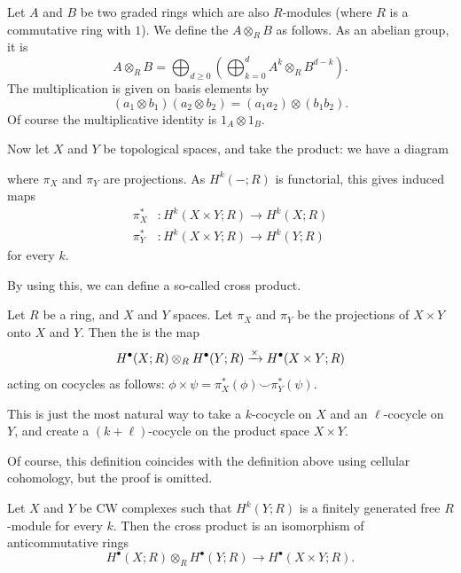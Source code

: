 \begin{definition}
	Let $A$ and $B$ be two graded rings which are also $R$-modules
	(where $R$ is a commutative ring with $1$).
	We define the  $A \otimes_R B$ as follows.
	As an abelian group, it is
	\[ A \otimes_R B = \bigoplus_{d \ge 0}
		\left( \bigoplus_{k=0}^{d} A^k \otimes_R B^{d-k}  \right). \]
	The multiplication is given on basis elements by
	\[ \left( a_1 \otimes b_1 \right)\left( a_2 \otimes b_2 \right)
		= (a_1a_2) \otimes (b_1b_2).
	\]
	Of course the multiplicative identity is $1_A \otimes 1_B$.
\end{definition}

Now let $X$ and $Y$ be topological spaces, and take the product:
we have a diagram
\begin{center}
\end{center}
where $\pi_X$ and $\pi_Y$ are projections.
As $H^k(-; R)$ is functorial, this gives induced maps
\begin{align*}
	\pi_X^\ast &: H^k(X \times Y; R) \to H^k(X; R) \\
	\pi_Y^\ast &: H^k(X \times Y; R) \to H^k(Y; R)
\end{align*}
for every $k$.

By using this, we can define a so-called cross product.
\begin{definition}
	Let $R$ be a ring, and $X$ and $Y$ spaces.
	Let $\pi_X$ and $\pi_Y$ be the projections of $X \times Y$
	onto $X$ and $Y$.
	Then the  is the map
	\[
		H^\bullet(X; R) \otimes_R H^\bullet(Y;R)
		\xrightarrow{\times} H^\bullet(X \times Y; R)
	\]
	acting on cocycles as follows:
	$\phi \times \psi = \pi_X^\ast(\phi) \smile \pi_Y^\ast(\psi)$.
\end{definition}

This is just the most natural way to take a $k$-cocycle
on $X$ and an $\ell$-cocycle on $Y$, and create a $(k+\ell)$-cocycle
on the product space $X \times Y$.

\begin{remark}
	Of course, this definition coincides with the definition above using cellular cohomology, but
	the proof is omitted.
\end{remark}

\begin{theorem}
	Let $X$ and $Y$ be CW complexes such that $H^k(Y;R)$
	is a finitely generated free $R$-module for every $k$.
	Then the cross product is an isomorphism of anticommutative rings
	\[
		H^\bullet(X;R) \otimes_R H^\bullet(Y;R)
		\to H^\bullet(X \times Y; R).
	\]
\end{theorem}


